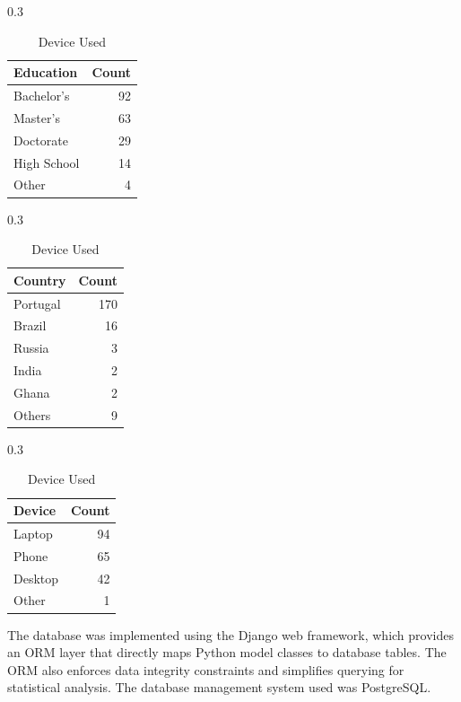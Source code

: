 \begin{table}[htbp]
    \begin{subtable}{0.3\textwidth}
        \centering
        \caption{Education Level}
        \begin{tabular}{lr}
            \hline
            \textbf{Education} & \textbf{Count} \\
            \hline
            Bachelor's & 92 \\
            Master's & 63 \\
            Doctorate & 29 \\
            High School & 14 \\
            Other & 4 \\
            \hline
        \end{tabular}
    \end{subtable}
    \hfill
    \begin{subtable}{0.3\textwidth}
        \centering
        \caption{Country of Origin}
        \begin{tabular}{lr}
            \hline
            \textbf{Country} & \textbf{Count} \\
            \hline
            Portugal & 170 \\
            Brazil & 16 \\
            Russia & 3  \\
            India & 2 \\
            Ghana & 2 \\
            Others & 9 \\
            \hline
        \end{tabular}
    \end{subtable}
    \hfill
    \begin{subtable}{0.3\textwidth}
        \centering
        \caption{Device Used}
        \begin{tabular}{lr}
            \hline
            \textbf{Device} & \textbf{Count} \\
            \hline
            Laptop & 94 \\
            Phone & 65 \\
            Desktop & 42 \\
            Other & 1 \\
            \hline
        \end{tabular}
    \end{subtable}
\end{table}

The database was implemented using the Django web framework, which provides an \acf{ORM} layer that directly maps Python model classes to database tables. The \acs{ORM} also enforces data integrity constraints and simplifies querying for statistical analysis. The database management system used was PostgreSQL.

